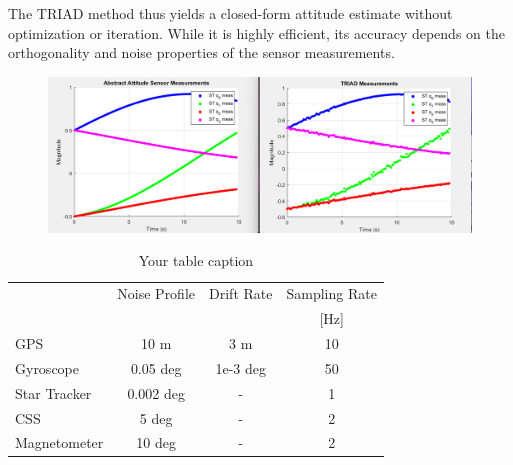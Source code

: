 The TRIAD method thus yields a closed-form attitude estimate without optimization or iteration. While it is highly efficient, its accuracy depends on the orthogonality and noise properties of the sensor measurements.

\begin{figure}[H]
    \centering
    \includegraphics[width=1\textwidth]{figures/modelling/TRIAD.png}
    \caption{}
    \label{fig:CSS}
\end{figure}



\begin{table}[H]
    \caption{Your table caption}
    \footnotesize
    \centering
    \begin{tabular}{lccc}    %
    \toprule
         & Noise Profile & Drift Rate &  Sampling Rate \\
         & & & [Hz] \\
    \midrule
        GPS & 10 m & 3 m & 10 \\
        Gyroscope & 0.05 deg & 1e-3 deg & 50 \\
        Star Tracker & 0.002 deg & - & 1 \\
        CSS & 5 deg & - & 2 \\
        Magnetometer & 10 deg & - & 2 \\
    \bottomrule
    \end{tabular}
    \label{tab:my_label}
\end{table}

\label{sec:modconclusion}